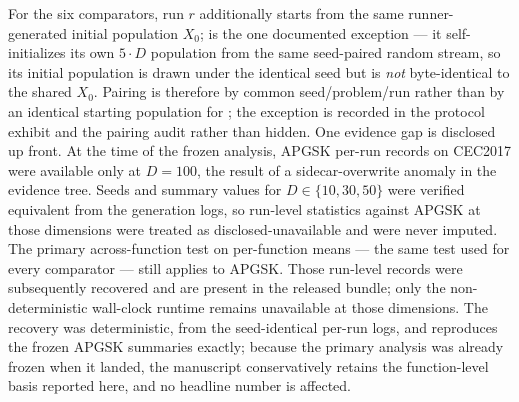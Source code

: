 For the six comparators, run $r$ additionally starts from the same
runner-generated initial population $X_{0}$; \dtgsk{} is the one
documented exception --- it self-initializes its own $5 \cdot D$ population
from the same seed-paired random stream, so its initial population is drawn
under the identical seed but is \emph{not} byte-identical to the shared
$X_{0}$. Pairing is therefore by common seed/problem/run rather than by an
identical starting population for \dtgsk{}; the exception is recorded in
the protocol exhibit and the pairing audit rather than hidden.
One evidence gap is disclosed up front. At the time of the frozen analysis,
APGSK per-run records on CEC2017 were available only at $D = 100$, the
result of a sidecar-overwrite anomaly in the evidence tree. Seeds and
summary values for $D \in \{10, 30, 50\}$ were verified equivalent from the
generation logs, so run-level statistics against APGSK at those dimensions
were treated as disclosed-unavailable and were never imputed. The primary
across-function test on per-function means --- the same test used for every
comparator --- still applies to APGSK. Those run-level records were
subsequently recovered and are present in the released bundle; only the
non-deterministic wall-clock runtime remains unavailable at those
dimensions. The recovery was deterministic, from the seed-identical per-run logs, and reproduces the frozen APGSK summaries exactly; because the primary analysis was already frozen when it landed, the manuscript conservatively retains the function-level basis reported here, and no headline number is affected.


